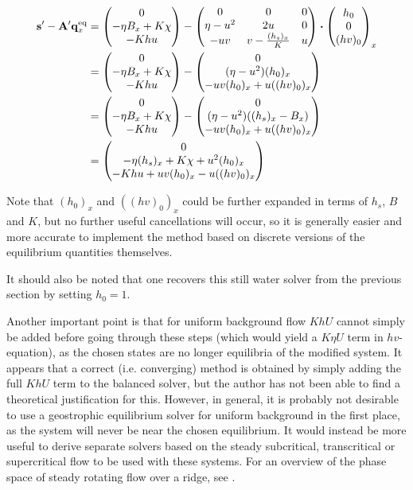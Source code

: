\begin{align}
  \vb s' - \vb A' \eq{\vb q}_x
  &= \mqty(0 \\ -\eta B_x + K \chi \\ - K h u) - \mqty(
    0 & 0 & 0 \\
    \eta - u^2 & 2u & 0 \\
    -uv & v - \frac{(h_s)_x}{K} & u
  ) \vdot \mqty(h_0 \\ 0 \\ (hv)_0)_x \\
  &= \mqty(0 \\ -\eta B_x + K \chi \\ - K h u) - \mqty(
    0 \\
    (\eta - u^2)(h_0)_x \\
    -uv(h_0)_x + u((hv)_0)_x
  ) \\
  &= \mqty(0 \\ -\eta B_x + K \chi \\ - K h u) - \mqty(
    0 \\
    (\eta - u^2)((h_s)_x - B_x) \\
    -uv(h_0)_x + u((hv)_0)_x
  ) \\
  &= \mqty(0 \\ -\eta (h_s)_x + K \chi + u^2 (h_0)_x \\ - K h u +uv(h_0)_x - u((hv)_0)_x)
\end{align}

Note that $(h_0)_x$ and $((hv)_0)_x$ could be further expanded in terms of $h_s$, $B$ and $K$, but no further useful cancellations will occur, so it is generally easier and more accurate to implement the method based on discrete versions of the equilibrium quantities themselves.

It should also be noted that one recovers this still water solver from the previous section by setting $h_0 = 1$.

Another important point is that for uniform background flow $KhU$ cannot simply be added before going through these steps (which would yield a $K\eta U$ term in $hv$-equation), as the chosen states are no longer equilibria of the modified system. It appears that a correct (i.e. converging) method is obtained by simply adding the full $KhU$ term to the balanced solver, but the author has not been able to find a theoretical justification for this. However, in general, it is probably not desirable to use a geostrophic equilibrium solver for uniform background in the first place, as the system will never be near the chosen equilibrium. It would instead be more useful to derive separate solvers based on the steady subcritical, transcritical or supercritical flow to be used with these systems. For an overview of the phase space of steady rotating flow over a ridge, see \citet{esler2005steady}.